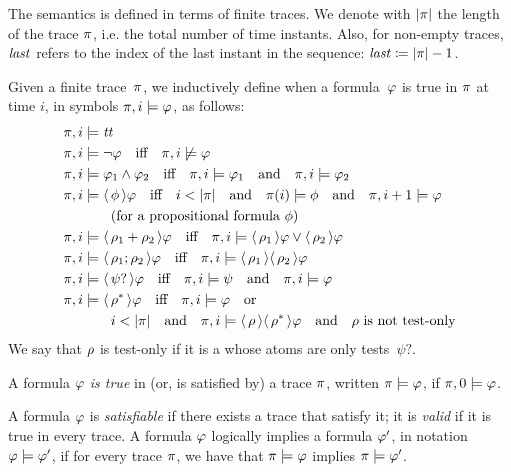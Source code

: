 The \ldl{} semantics is defined in terms of finite traces. We denote with
$\lvert\pi\rvert$ the length of the trace $\pi$, i.e. the total number of time
instants. Also, for non-empty traces, $\text{\textit{last}}$ refers to the index of the
last instant in the sequence: $\text{\textit{last}} \coloneqq \lvert\pi\rvert-1$.
\begin{definition}
	Given a finite trace~$\pi$, we inductively define when a \ldl{}
	formula~$\varphi$ is true in $\pi$ at time $i$, in symbols ${\pi, i
	\models \varphi}$, as follows:
	\begin{align*}
		\pi, i &\models \text{\textit{tt}} \\
		\pi, i &\models \neg \varphi \quad \text{iff} \quad
			\pi, i \not\models \varphi \\
		\pi, i &\models \varphi_1 \land \varphi_2 \quad \text{iff} \quad
			\pi, i \models \varphi_1 \quad \text{and} \quad
			\pi, i \models \varphi_2 \\
		\pi, i &\models \langle\, {\phi} \,\rangle \varphi \quad \text{iff} \quad
			i < \lvert\pi\rvert \quad \text{and} \quad \pi(i) \models \phi
			\quad \text{and} \quad \pi, i+1 \models \varphi \\
			& \qquad \text{(for a propositional formula~$\phi$)} \\
		\pi, i &\models \langle\, {\rho_1 + \rho_2} \,\rangle \varphi \quad \text{iff} \quad
			\pi, i \models \langle\, {\rho_1} \,\rangle \varphi \lor \langle\, {\rho_2} \,\rangle
			\varphi \\
		\pi, i &\models \langle\, {\rho_1 ; \rho_2} \,\rangle \varphi \quad \text{iff} \quad
			\pi, i \models \langle\, {\rho_1} \,\rangle \langle\, {\rho_2} \,\rangle \varphi \\
		\pi, i &\models \langle\, {\psi?} \,\rangle \varphi \quad \text{iff} \quad
			\pi, i \models \psi \quad \text{and} \quad
			\pi, i \models \varphi \\
		\pi, i &\models \langle\, {\rho^*} \,\rangle \varphi \quad \text{iff} \quad
			\pi, i \models \varphi \quad \text{or} \quad \\
			& \qquad i < \lvert\pi\rvert \quad \text{and} \quad \pi, i \models
			\langle\, {\rho} \,\rangle\langle\, {\rho^*} \,\rangle \varphi \quad \text{and} \quad
			\text{$\rho$ is not test-only}
	\end{align*}
	We say that $\rho$ is test-only if it is a \re{} whose atoms are only
	tests~$\psi?$.
	\label{def:ldlf-semanitcs}
\end{definition}

\begin{definition}
	A \ldl{} formula $\varphi$ \emph{is true} in (or, is satisfied by) a trace
	$\pi$, written ${\pi \models \varphi}$, if ${\pi, 0 \models
	\varphi}$.
\end{definition}
\begin{definition}
	A \ldl{} formula $\varphi$ is \emph{satisfiable} if there exists a
	trace that satisfy it; it is \emph{valid} if it is true in every trace.
	A formula $\varphi$ logically implies a formula $\varphi'$, in notation 
	${\varphi \models \varphi'}$, if for every trace $\pi$, we have that
	${\pi \models \varphi}$ implies ${\pi \models \varphi'}$.
\end{definition}

